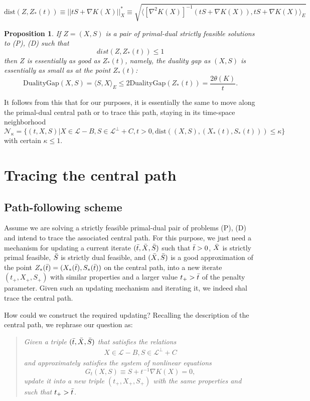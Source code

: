 \documentclass[11pt,a4paper]{article}
\newtheorem{prop}[thm]{Proposition}
\begin{document}
\[\text{dist}(Z,Z_*(t)) \equiv ||tS+\nabla K(X)||^*_X \equiv \sqrt{\langle[\nabla^2 K(X)]^{-1}(tS+\nabla K(X)), tS+\nabla K(X) \rangle_E}\]

\begin{prop}
    If $Z=(X,S)$ is a pair of primal-dual strictly feasible solutions to (P), (D) such that
    \[dist(Z, Z_*(t)) \leq 1\]
    then $Z$ is essentially as good as $Z_*(t)$, namely, the duality gap as $(X,S)$ is essentially as small as at the point $Z_*(t)$:
    \[\text{DualityGap}(X,S) = \langle S,X\rangle_E \leq 2\text{DualityGap}(Z_*(t)) = \frac{2\theta(K)}{t}.\]
\end{prop}

It follows from this that for our purposes, it is essentially the same to move along the primal-dual central path or to trace this path, staying in its time-space neighborhood
\[\mathcal{N}_\kappa = \{(t,X,S) | X \in \mathcal{L}-B, S\in \mathcal{L}^\perp+C, t>0, \text{dist}((X,S),(X_*(t),S_*(t)))\leq \kappa\}\]
with certain $\kappa \leq 1$.

\section{Tracing the central path}

\subsection{Path-following scheme}

Assume we are solving a strictly feasible primal-dual pair of problems (P), (D) and intend to trace the associated central path. For this purpose, we just need a mechanism for updating a current iterate $(\Bar{t}, \Bar{X}, \Bar{S})$ such that $\Bar{t}>0$, $\Bar{X}$ is strictly primal feasible, $\Bar{S}$ is strictly dual feasible, and $(\Bar{X}, \Bar{S})$ is a good approximation of the point $Z_*(\Bar{t}) = (X_*(\Bar{t}), S_*(\Bar{t}))$ on the central path, into a new iterate $(t_+, X_+, S_+)$ with similar properties and a larger value $t_+ > \Bar{t}$ of the penalty parameter. Given such an updating mechanism and iterating it, we indeed shal trace the central path.

How could we construct the required updating? Recalling the description of the central path, we rephrase our question as:

\begin{quote}
\textit{Given a triple $(\Bar{t}, \Bar{X}, \Bar{S})$ that satisfies the relations
\begin{align}\label{sys:4}
    X \in \mathcal{L}-B,
    S \in \mathcal{L}^\perp+C
\end{align}
and approximately satisfies the system of nonlinear equations
\begin{equation} \label{eq:5}
    G_t(X,S) \equiv S+t^{-1}\nabla K(X) = 0,
\end{equation}
update it into a new triple $(t_+, X_+, S_+)$ with the same properties and such that $t_+>\Bar{t}$.
}
\end{quote}
\end{document}
